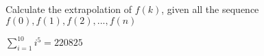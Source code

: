 
Calculate the extrapolation of $f(k)$, given all the sequence $f(0), f(1), f(2), ..., f(n)$

$\sum_{i=1}^{10}{i^5} = 220825$